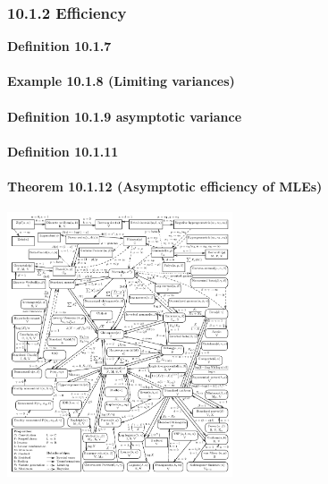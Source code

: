 \documentclass[6pt,twocolumn,Portrait]{article}
\let\oldparagraph\paragraph
\renewcommand{\paragraph}[1]{\oldparagraph{#1}\mbox{}}
\begin{document}
\hypertarget{efficiency}{%
\subsubsection{10.1.2 Efficiency}\label{efficiency}}

\textbf{Definition 10.1.7}

\hypertarget{LimD}{%
\paragraph{\texorpdfstring{\textbf{Example 10.1.8 (Limiting
variances)}}{Example 10.1.8 (Limiting variances)}}\label{LimD}}

\hypertarget{asymV}{%
\paragraph{\texorpdfstring{\textbf{Definition 10.1.9 asymptotic
variance}}{Definition 10.1.9 asymptotic variance}}\label{asymV}}

\hypertarget{effi}{%
\paragraph{\texorpdfstring{\textbf{Definition
10.1.11}}{Definition 10.1.11}}\label{effi}}

\hypertarget{asymE}{%
\paragraph{\texorpdfstring{\textbf{Theorem 10.1.12 (Asymptotic
efficiency of
MLEs)}}{Theorem 10.1.12 (Asymptotic efficiency of MLEs)}}\label{asymE}}

\includegraphics[width=0.5\textwidth,height=\textheight]{UnivariateDistribution.png}
\end{document}
